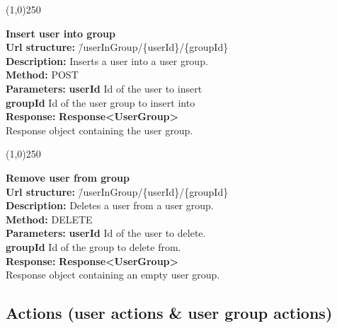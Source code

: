\documentclass[11pt]{article}
\begin{document}
\begin{center}\line(1,0){250}\end{center}

\begin{tabbing}
\textbf{Insert user into group} \\
\textcolor{black!60}{\textbf{Url structure:}} \hspace{0.2in} \= /userInGroup/\{userId\}/\{groupId\} \\
\textcolor{black!60}{\textbf{Description:}}  \> Inserts a user into a user group. \\
\textcolor{black!60}{\textbf{Method:}} \> POST \\
\textcolor{black!60}{\textbf{Parameters:}} \> \textbf{userId} Id of the user to insert \\
\> \textbf{groupId} Id of the user group to insert into \\
\textcolor{black!60}{\textbf{Response:}} \> \textbf{Response<UserGroup>} \\
\> Response object containing the user group.
\end{tabbing}

\begin{center}\line(1,0){250}\end{center}

\begin{tabbing}
\textbf{Remove user from group} \\
\textcolor{black!60}{\textbf{Url structure:}} \hspace{0.2in} \= /userInGroup/\{userId\}/\{groupId\} \\
\textcolor{black!60}{\textbf{Description:}}  \> Deletes a user from a user group. \\
\textcolor{black!60}{\textbf{Method:}} \> DELETE \\
\textcolor{black!60}{\textbf{Parameters:}} \> \textbf{userId} Id of the user to delete. \\
\> \textbf{groupId} Id of the group to delete from. \\
\textcolor{black!60}{\textbf{Response:}} \> \textbf{Response<UserGroup>} \\
\> Response object containing an empty user group.
\end{tabbing}

\newpage

\subsection{Actions (user actions \& user group actions)}
\end{document}
